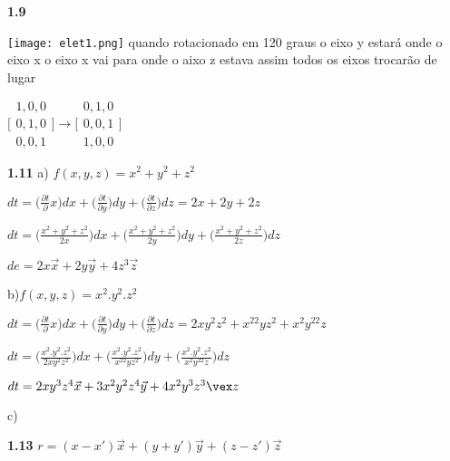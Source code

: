 \documentclass{article}
\begin{document}
\textbf{1.9} \newline

\texttt{[image: elet1.png]}\newline
quando rotacionado em 120 graus o eixo y estará onde o eixo x o eixo x vai para onde o aixo z estava assim todos os eixos trocarão de lugar 

$\Bigg[ \begin{array}{c}
1,0,0\\
0,1,0\\
0,0,1
\end{array}{}\Bigg]
\rightarrow\Bigg[ \begin{array}{c}
0,1,0\\
0,0,1\\
1,0,0
\end{array}{}\Bigg]
$\newline\newline



\textbf{1.11}\newline
a) $f(x,y,z)=x^2+y^2+z^2$

$dt=\big(\frac{\partial t}{\partial }x\big)
dx +\big(\frac{\partial t}{\partial y}\big) dy+ \big(\frac{\partial t}{\partial z} \big)dz = 2x+2y+2z $

$dt= \big(\frac{x^2+ y^2+z^2}{2x}\big)dx + \big(\frac{x^2+ y^2+z^2}{2y}\big)dy + \big(\frac{x^2+ y^2+z^2}{2z}\big)dz$

$de=2x \vec x + 2y\vec y +4z^3\vec z$\newline\newline

b)$f(x,y,z)=x^2.y^2.z^2$

$dt=\big(\frac{\partial t}{\partial }x\big)
dx +\big(\frac{\partial t}{\partial y}\big) dy+ \big(\frac{\partial t}{\partial z} \big)dz = 2xy^2z^2 + x^22yz^2 + x^2y^22z $

$dt= \big(\frac{x^2.y^2.z^2}{2xy^2z^2}\big)dx + \big(\frac{x^2.y^2.z^2}{x^22yz^2}\big)dy + \big(\frac{x^2.y^2.z^2}{x^2y^22z}\big)dz$

$dt= 2xy^3z^4 \vec x + 3x^2y^2z^4 \vec y + 4x^2y^3z^3\vex z$ \newline\newline

c)\newline\newline

\textbf{1.13}\newline
$r= (x-x')\vec x +(y+ y')\vec y+ (z- z')\vec z$
\end{document}
